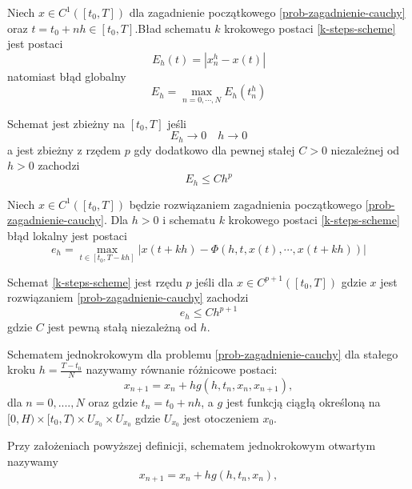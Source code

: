\documentclass[12pt,a4paper]{report}
\begin{document}
\begin{definition}
Niech $ x \in C^{1}([t_0,T])$ dla zagadnienie początkowego \ref{prob-zagadnienie-cauchy} oraz $t=t_0 +nh \in [t_0,T]$.Bład schematu $k$ krokowego postaci \ref{k-steps-scheme} jest postaci 
$$
E_h(t) = |x^{h}_{n} - x(t)|
$$ 
natomiast błąd globalny 
$$
E_h = \max_{n=0,\cdots,N} E_h(t^{h}_{n})
$$
\end{definition}
\begin{definition}
Schemat jest zbieżny na $[t_0,T]$ jeśli 
$$
E_h \to 0 \quad h \to 0
$$
a jest zbieżny z rzędem $p$ gdy dodatkowo dla pewnej stałej $C>0$ niezależnej od $h>0$ zachodzi 
$$
E_h \leq C h^p
$$
\end{definition}
\begin{definition}
Niech $x \in C^1([t_0,T]) $ będzie rozwiązaniem zagadnienia początkowego \ref{prob-zagadnienie-cauchy}. Dla $h>0$ i schematu $k$ krokowego postaci \ref{k-steps-scheme} błąd lokalny jest postaci
\begin{equation}
e_h = \max_{t \in [t_0,T-kh]} |x(t + kh) - \Phi (h,t,x(t),\cdots, x(t + kh))|
\end{equation}
\end{definition}
\begin{definition}
Schemat \ref{k-steps-scheme} jest rzędu $p$ jeśli dla $x \in C^{p+1}([t_0,T])$ gdzie $x$ jest rozwiązaniem \ref{prob-zagadnienie-cauchy} zachodzi
$$
e_h \leq C h^{p+1}
$$
gdzie $C$ jest pewną stałą niezależną od $h$. 
\end{definition}
\begin{definition}
Schematem jednokrokowym dla problemu \ref{prob-zagadnienie-cauchy} dla stałego kroku $h = \frac{T-t_0}{N}$ nazywamy równanie różnicowe postaci:
$$
x_{n+1} = x_n + h g(h,t_{n},x_{n},x_{n+1}),  
$$
dla $n = 0,....,N$ oraz gdzie $t_{n} = t_{0} + nh$, a $g$ jest funkcją ciągłą określoną na $[0,H) \times [t_0,T) \times U_{x_0} \times U_{x_0} $ gdzie $ U_{x_0} $ jest otoczeniem $x_0$.   
\end{definition}
\begin{definition}
Przy założeniach powyższej definicji, schematem jednokrokowym otwartym nazywamy 
$$
x_{n+1} = x_n + h g(h,t_{n},x_{n}),  
$$
\end{definition}
 
\end{document}
